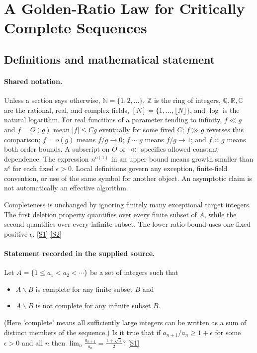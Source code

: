\documentclass[11pt,a4paper]{article}
\newcommand{\N}{\mathbb{N}}
\newcommand{\Z}{\mathbb{Z}}
\newcommand{\Q}{\mathbb{Q}}
\newcommand{\R}{\mathbb{R}}
\newcommand{\C}{\mathbb{C}}
\newcommand{\sref}[2]{\hyperlink{source:#1:#2}{[S#2]}}
\begin{document}
\section{A Golden-Ratio Law for Critically Complete Sequences}\label{statement}


\subsection{Definitions and mathematical statement}

\paragraph{Shared notation.}Unless a section says otherwise, $\N=\{1,2,\ldots\}$,
$\Z$ is the ring of integers, $\Q,\R,\C$ are the rational, real, and complex
fields, $[N]=\{1,\ldots,\lfloor N\rfloor\}$, and $\log$ is the natural
logarithm. For real functions of a parameter tending to infinity,
$f\ll g$ and $f=O(g)$ mean $|f|\leq Cg$ eventually for some fixed $C$;
$f\gg g$ reverses this comparison; $f=o(g)$ means $f/g\to0$;
$f\sim g$ means $f/g\to1$; and $f\asymp g$ means both order bounds.
A subscript on $O$ or $\ll$ specifies allowed constant dependence.
The expression $n^{o(1)}$ in an upper bound means growth smaller than
$n^\epsilon$ for each fixed $\epsilon>0$. Local definitions govern any
exception, finite-field convention, or use of the same symbol for another
object. An asymptotic claim is not automatically an effective algorithm.



Completeness is unchanged by ignoring finitely many exceptional target integers. The first deletion property quantifies over every finite subset of $A$, while the second quantifies over every infinite subset. The lower ratio bound uses one fixed positive $\epsilon$. \sref{statement}{1} \sref{statement}{2}

\paragraph{Statement recorded in the supplied source.}
Let $A=\{1\leq a_1< a_2<\cdots\}$ be a set of integers such that
\begin{itemize}
\item  $A\backslash B$ is complete for any finite subset $B$ and 
\item  $A\backslash B$ is not complete for any infinite subset $B$.
\end{itemize}
(Here 'complete' means all sufficiently large integers can be written as a sum of distinct members of the sequence.)
Is it true that if $a_{n+1}/a_n \geq 1+\epsilon$ for some $\epsilon>0$ and all $n$ then $ \lim_n \frac{a_{n+1}}{a_n}=\frac{1+\sqrt{5}}{2}? $ \sref{statement}{1}
\end{document}

